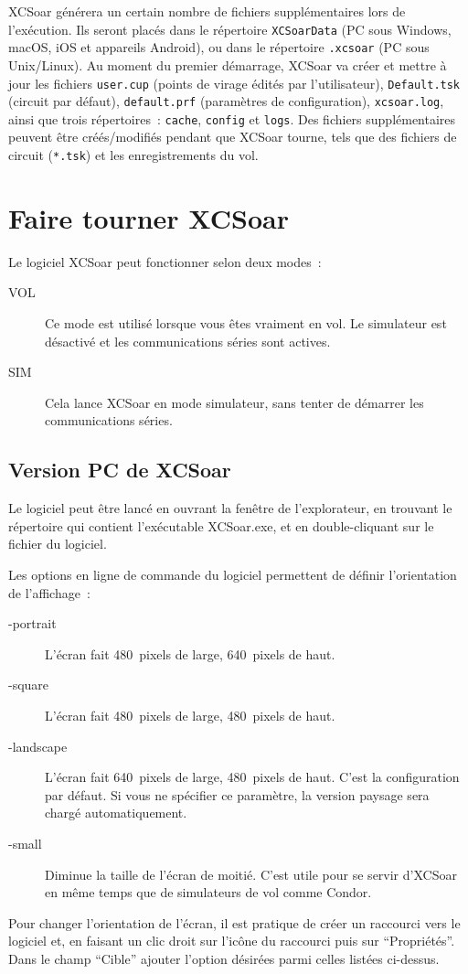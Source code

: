 XCSoar générera un certain nombre de fichiers supplémentaires lors de l'exécution. Ils
seront placés dans le répertoire \texttt{XCSoarData} (PC sous Windows, macOS,
iOS et appareils Android), ou dans le répertoire \texttt{.xcsoar} (PC sous
Unix/Linux). Au moment du premier démarrage, XCSoar va créer et mettre à jour les fichiers
\texttt{user.cup} (points de virage édités par l'utilisateur),
\texttt{Default.tsk} (circuit par défaut), 
\texttt{default.prf} 
(paramètres de configuration),
\texttt{xcsoar.log}, 
ainsi que trois répertoires~: \texttt{cache},
\texttt{config} et \texttt{logs}. Des fichiers supplémentaires peuvent être 
créés/modifiés pendant que XCSoar tourne, tels que des fichiers de circuit
(\texttt{*.tsk}) et les enregistrements du vol.


\section{Faire tourner XCSoar}

Le logiciel XCSoar peut fonctionner selon deux modes~:
\begin{description}
\item[VOL] Ce mode est utilisé lorsque vous êtes vraiment en vol. Le simulateur est
 désactivé et les communications séries sont actives. 
\item[SIM] Cela lance XCSoar en mode simulateur, sans tenter de démarrer
 les communications séries.
\end{description}

\subsection*{Version PC de XCSoar}
Le logiciel peut être lancé en ouvrant la fenêtre de l'explorateur, en trouvant le répertoire
qui contient l'exécutable XCSoar.exe, et en double-cliquant sur le fichier du logiciel.

Les options en ligne de commande du logiciel permettent de définir
l'orientation de l'affichage~:
\begin{description}
\item[-portrait] L'écran fait 480~pixels de large, 640~pixels de haut.
\item[-square] L'écran fait 480~pixels de large, 480~pixels de haut.
\item[-landscape] L'écran fait 640~pixels de large, 480~pixels de haut. C'est la 
configuration par défaut. Si vous ne spécifier ce paramètre, la version paysage sera
chargé automatiquement.
\item[-small] Diminue la taille de l'écran de moitié. C'est utile pour se servir d'XCSoar en
même temps que de simulateurs de vol comme Condor.
\end{description}
Pour changer l'orientation de l'écran, il est pratique de créer un raccourci vers le
logiciel et, en faisant un clic droit sur l'icône du raccourci puis sur ``Propriétés''.
Dans le champ ``Cible'' ajouter l'option désirées parmi celles listées ci-dessus.

